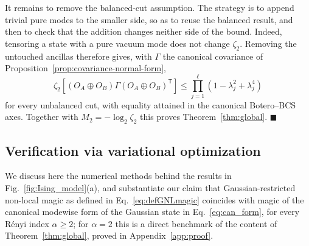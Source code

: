 \documentclass[prx,twocolumn,superscriptaddress,aps,10pt, frontmatterverbose, reprint,footinbib,longbibliography=true]{revtex4-2}
\newcommand{\trans}{\mathsf{T}}
\newcommand{\RENYI}{\alpha}
\begin{document}
It remains to remove the balanced-cut assumption. The strategy is to append trivial pure modes to the smaller side, so as to reuse the balanced result, and then to check that the addition changes neither side of the bound. Indeed, tensoring a state with a pure vacuum mode does not change $\zeta_2$. Removing the untouched ancillas therefore gives, with $\Gamma$ the canonical covariance of Proposition~\ref{prop:covariance-normal-form},
\begin{equation}
    \zeta_2\!\left[(O_A\oplus O_B)\Gamma(O_A\oplus O_B)^{\trans}\right]\le\prod_{j=1}^{\ell}\left(1-\lambda_j^2+\lambda_j^4\right)
\end{equation}
for every unbalanced cut, with equality attained in the canonical Botero--BCS axes. Together with $M_2=-\log_2\zeta_2$ this proves Theorem~\ref{thm:global}. \hfill$\blacksquare$

\subsection{Verification via variational optimization}
\label{app:variational}

We discuss here the numerical methods behind the results in Fig.~\ref{fig:Ising_model}(a), and substantiate our claim that Gaussian-restricted non-local magic as defined in Eq.~\eqref{eq:defGNLmagic} coincides with magic of the canonical modewise form of the Gaussian state in Eq.~\eqref{eq:can_form}, for every R\'enyi index $\RENYI\ge2$; for $\RENYI=2$ this is a direct benchmark of the content of Theorem~\ref{thm:global}, proved in Appendix~\ref{app:proof}.
\end{document}
